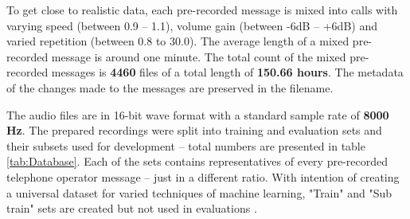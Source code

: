 \documentclass{ExcelAtFIT}
\begin{document}
To get close to realistic data, each pre-recorded message is mixed into calls with varying speed (between 0.9 -- 1.1), volume gain (between -6dB -- +6dB) and varied repetition (between 0.8 to 30.0). The average length of a mixed pre-recorded message is around one minute.
The total count of the mixed pre-recorded messages is \textbf{4460} files of a total length of \textbf{150.66 hours}. The metadata of the changes made to the messages are preserved in the filename. 

The audio files are in 16-bit wave format with a standard sample rate of \textbf{8000 Hz}.
The prepared recordings were split into training and evaluation sets and their subsets used for development -- total numbers are presented in table \ref{tab:Database}. Each of the sets contains representatives of every pre-recorded telephone operator message -- just in a different ratio. With intention of creating a universal dataset for varied techniques of machine learning, "Train" and "Sub train" sets are created but not used in evaluations \cite{bobos}.
\end{document}
